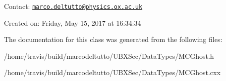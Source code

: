 Contact\-: \href{mailto:marco.deltutto@physics.ox.ac.uk}{\tt marco.\-deltutto@physics.\-ox.\-ac.\-uk}

Created on\-: Friday, May 15, 2017 at 16\-:34\-:34 

The documentation for this class was generated from the following files\-:\begin{DoxyCompactItemize}
\item 
/home/travis/build/marcodeltutto/\-U\-B\-X\-Sec/\-Data\-Types/M\-C\-Ghost.\-h\item 
/home/travis/build/marcodeltutto/\-U\-B\-X\-Sec/\-Data\-Types/M\-C\-Ghost.\-cxx\end{DoxyCompactItemize}
